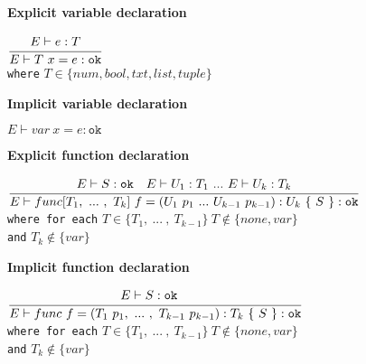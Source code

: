 \textbf{Explicit variable declaration}\\
\begin{center}
	\begin{math}
		\cfrac
		{E \vdash e : T}
		{E \vdash T\ x = e : \texttt{ok}}
	\end{math}
	\\[1\baselineskip]
	\texttt{where} $T \in \{num, bool, txt, list, tuple\}$
\end{center}

\textbf{Implicit variable declaration}\\
\begin{center}
	\begin{math}
	E \vdash var\ x = e : \texttt{ok}
	\end{math}
\end{center}

\textbf{Explicit function declaration}\\
\begin{center}
	\begin{math}
		\cfrac
		{E\vdash S : \texttt{ok}\quad E \vdash U_1 : T_1\
			.
			.
			.
			\ E \vdash U_k : T_k}
		{E \vdash func[T_1,\
			.
			.
			.
			\ ,\ T_k]\ f = (U_1\ p_1\
			.
			.
			.
			\ U_{k-1}\ p_{k-1}): U_k\ \{\ S\ \} : \texttt{ok}}
	\end{math}
	\\[1\baselineskip]
	\texttt{where for each} $T \in \{T_1,\ .
	.
	.
	\ ,\ T_{k-1}\}\ T \notin \{none, var\}$\\
	\texttt{and} $T_k \notin \{var\}$
\end{center}

\textbf{Implicit function declaration}\\
\begin{center}
	\begin{math}
		\cfrac
		{E\vdash S : \texttt{ok}\quad}
		{E \vdash func\ f = (T_1\ p_1,\
		.
		.
		.
		\ ,\ T_{k-1}\ p_{k-1}): T_k\ \{\ S\ \} : \texttt{ok}}
	\end{math}
	\\[1\baselineskip]
	\texttt{where for each} $T \in \{T_1,\ .
	.
	.
	\ ,\ T_{k-1}\}\ T \notin \{none, var\}$\\
	\texttt{and} $T_k \notin \{var\}$
\end{center}


